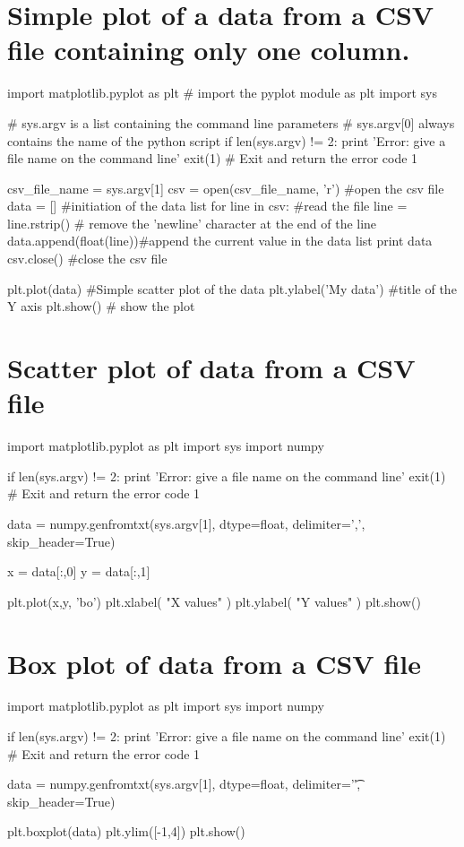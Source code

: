 \documentclass[article,10pt]{scrartcl}
\begin{document}
\section{Simple plot of a data from a CSV file containing only one column.}
\begin{python}
import matplotlib.pyplot as plt # import the pyplot module as plt
import sys

# sys.argv is a list containing the command line parameters
# sys.argv[0] always contains the name of the python script
if len(sys.argv) != 2:
   print 'Error: give a file name on the command line'
   exit(1) # Exit and return the error code 1

csv_file_name = sys.argv[1]
csv = open(csv_file_name, 'r') #open the csv file
data = [] #initiation of the data list
for line in csv: #read the file
   line = line.rstrip() # remove the 'newline' character at the end of the line
   data.append(float(line))#append the current value in the data list
print data
csv.close() #close the csv file

plt.plot(data) #Simple scatter plot of the data
plt.ylabel('My data') #title of the Y axis
plt.show() # show the plot
\end{python}

\section{Scatter plot of data from a CSV file}
\begin{python}
import matplotlib.pyplot as plt
import sys
import numpy

if len(sys.argv) != 2:
   print 'Error: give a file name on the command line'
   exit(1) # Exit and return the error code 1

data = numpy.genfromtxt(sys.argv[1], dtype=float, delimiter=',', skip_header=True) 

x = data[:,0]
y = data[:,1]

plt.plot(x,y, 'bo')
plt.xlabel( "X values" )
plt.ylabel( "Y values" )
plt.show()
\end{python}
\newpage{}
\section{Box plot of data from a CSV file}
\begin{python}
import matplotlib.pyplot as plt
import sys
import numpy

if len(sys.argv) != 2:
   print 'Error: give a file name on the command line'
   exit(1) # Exit and return the error code 1

data = numpy.genfromtxt(sys.argv[1], dtype=float, delimiter='\t', skip_header=True) 

plt.boxplot(data)
plt.ylim([-1,4])
plt.show()
\end{python}
\end{document}
